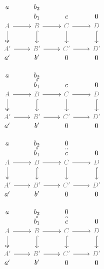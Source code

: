 \documentclass[12pt]{article}
\begin{document}
\begin{equation*}
  \begin{tikzcd}
    a &b_2&\phantom 0 \\[-2em]
     &b_1& c  & 0\\[-2em]
    \color{gray}A\rar[black]\dar[two heads] & \color{gray}B\rar\dar[hook] & \color{gray}C\rar\dar & \color{gray}D\dar[hook] \\
    \color{gray}A'\rar &\color{gray} B'\rar &\color{gray} C'\rar &\color{gray} D' \\[-2em]
    a' & b' & 0 & 0
  \end{tikzcd}
\end{equation*}


\begin{equation*}
  \begin{tikzcd}
    a &b_2\dar[equals] &\phantom 0 \\[-2em]
      &b_1& c  & 0\\[-2em]
    \color{gray}A\rar\dar[two heads] & \color{gray}B\rar\dar[hook,black] & \color{gray}C\rar\dar & \color{gray}D\dar[hook] \\
    \color{gray}A'\rar &\color{gray} B'\rar &\color{gray} C'\rar &\color{gray} D' \\[-2em]
    a' & b' & 0 & 0
  \end{tikzcd}
\end{equation*}

\begin{equation*}
  \begin{tikzcd}
    a &b_2\dar[equals]& 0\dar[equals] \\[-2em]
      &b_1& c  & 0\\[-2em]
    \color{gray}A\rar\dar[two heads] & \color{gray}B\rar\dar[hook] & \color{gray}C\rar\dar & \color{gray}D\dar[hook] \\
    \color{gray}A'\rar &\color{gray} B'\rar &\color{gray} C'\rar &\color{gray} D' \\[-2em]
    a' & b' & 0 & 0
  \end{tikzcd}
\end{equation*}

\begin{equation*}
  \begin{tikzcd}
    a &b_2\dar[equals]& 0\dar[equals] \\[-2em]
      &b_1& c  & 0\\[-2em]
    \color{gray}A\rar\dar[two heads] & \color{gray}B\rar\dar[hook] & \color{gray}C\rar\dar[black,hook] & \color{gray}D\dar[hook] \\
    \color{gray}A'\rar &\color{gray} B'\rar &\color{gray} C'\rar &\color{gray} D' \\[-2em]
    a' & b' & 0 & 0
  \end{tikzcd}
\end{equation*}
\end{document}
